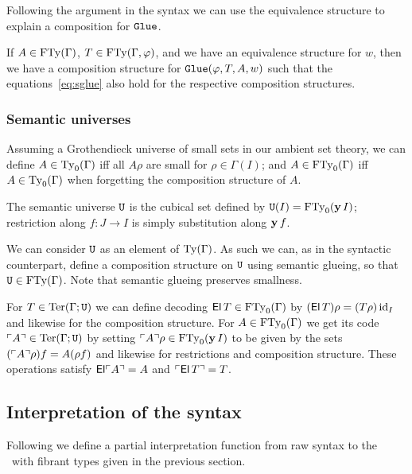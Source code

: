 Following the argument in the syntax we can use the equivalence
structure to explain a composition for $\operatorname{\mathtt{Glue}}$.
\begin{theorem}
  \label{thm:gluefibrant}
  If $A \in \operatorname{FTy} (\Gamma)$, $T \in \operatorname{FTy}(\Gamma,\varphi)$, and we have
  an equivalence structure for $w$, then we have a composition
  structure for $\operatorname{\mathtt{Glue}}(\varphi,T,A,w)$ such that the
  equations~\eqref{eq:sglue} also hold for the respective composition
  structures.
\end{theorem}


\subsubsection*{Semantic universes}

Assuming a Grothendieck universe of small sets in our ambient set
theory, we can define $A \in \operatorname{Ty}_0 (\Gamma)$ if{f} all $A \rho$ are
small for $\rho \in \Gamma(I)$; and $A \in \operatorname{FTy}_0 (\Gamma)$ if{f} $A
\in \operatorname{Ty}_0 (\Gamma)$ when forgetting the composition structure of $A$.

\begin{definition}
  \label{def:semantic-universe}
  The semantic universe $\mathtt{U}$ is the cubical set defined by $\mathtt{U} (I) =
  \operatorname{FTy}_0 (\operatorname{\mathbf{y}} I)$; restriction along $f \colon J \to I$ is simply
  substitution along $\operatorname{\mathbf{y}} f$.
\end{definition}

We can consider $\mathtt{U}$ as an element of $\operatorname{Ty} (\Gamma)$.  As such we
can, as in the syntactic counterpart, define a composition structure
on $\mathtt{U}$ using semantic glueing, so that $\mathtt{U} \in \operatorname{FTy} (\Gamma)$.
Note that semantic glueing preserves smallness.

For $T \in \operatorname{Ter} (\Gamma; \mathtt{U})$ we can define decoding $\operatorname{\mathsf{El}} T \in
\operatorname{FTy}_0 (\Gamma)$ by $(\operatorname{\mathsf{El}} T) \rho = (T \rho) \, \mathrm{id}_I$ and likewise for
the composition structure.  For $A \in \operatorname{FTy}_0 (\Gamma)$ we get its
code $\ulcorner A \urcorner \in \operatorname{Ter} (\Gamma;\mathtt{U})$ by setting $\ulcorner A \urcorner \rho \in
\operatorname{FTy}_0 (\operatorname{\mathbf{y}} I)$ to be given by the sets $(\ulcorner A \urcorner \rho) f = A
(\rho f)$ and likewise for restrictions and composition structure.
These operations satisfy $\operatorname{\mathsf{El}} \ulcorner A \urcorner = A$ and $\ulcorner \operatorname{\mathsf{El}} T \urcorner = T$.


\subsection{Interpretation of the syntax}
\label{sec:interpretation}

Following \cite{Streicher91} we define a partial interpretation
function from raw syntax to the \cwf\ with fibrant types given in the
previous section.


